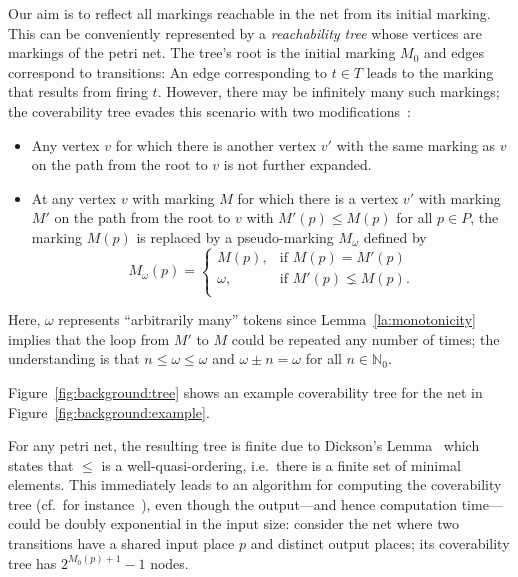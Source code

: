 Our aim is to reflect all markings reachable in the net from its initial marking. This can be conveniently represented by a \emph{reachability tree} whose vertices are markings of the petri net. The tree's root is the initial marking $M_0$ and edges correspond to transitions: An edge corresponding to $t\in T$ leads to the marking that results from firing $t$. However, there may be infinitely many such markings; the coverability tree evades this scenario with two modifications~\cite{murata1989petri}:
\begin{itemize}
	\item Any vertex $v$ for which there is another vertex $v'$ with the same marking as $v$ on the path from the root to $v$ is not further expanded.
	\item At any vertex $v$ with marking $M$ for which there is a vertex $v'$ with marking $M'$ on the path from the root to $v$ with $M'(p)\le M(p)$ for all $p\in P$, the marking $M(p)$ is replaced by a pseudo-marking $M_\omega$ defined by \[
	M_\omega(p)=\begin{cases}
	M(p),&\text{if }M(p)=M'(p)\\
	\omega,&\text{if }M'(p)\lneq M(p).\\
	\end{cases}
	\]
\end{itemize}

Here, $\omega$ represents ``arbitrarily many'' tokens since Lemma~\ref{la:monotonicity} implies that the loop from $M'$ to $M$ could be repeated any number of times; the understanding is that $n\le\omega\le\omega$ and $\omega\pm n=\omega$ for all $n\in\mathbb{N}_0$.

Figure~\ref{fig:background:tree} shows an example coverability tree for the net in Figure~\ref{fig:background:example}.

For any petri net, the resulting tree is finite due to Dickson's Lemma~\cite{dickson1913finiteness} which states that $\le$ is a well-quasi-ordering, i.e.\ there is a finite set of minimal elements. This immediately leads to an algorithm for computing the coverability tree (cf.\ for instance~\cite{murata1989petri}), even though the output---and hence computation time---could be doubly exponential in the input size: consider the net where two transitions have a shared input place $p$ and distinct output places; its coverability tree has $2^{M_0(p)+1}-1$ nodes.

